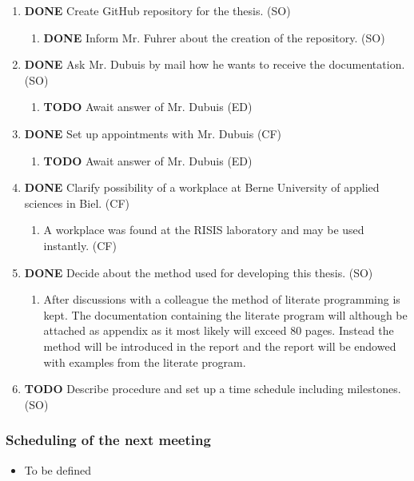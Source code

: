 \documentclass[10pt, openright, notitlepage]{scrreprt}
\begin{document}
\begin{enumerate}
\item {\bfseries\sffamily DONE} Create GitHub repository for the thesis. (SO)
\label{sec:org4871338}
\begin{enumerate}
\item {\bfseries\sffamily DONE} Inform Mr. Fuhrer about the creation of the repository. (SO)
\label{sec:orgc65ff25}
\end{enumerate}

\item {\bfseries\sffamily DONE} Ask Mr. Dubuis by mail how he wants to receive the documentation. (SO)
\label{sec:orgde68638}
\begin{enumerate}
\item {\bfseries\sffamily TODO} Await answer of Mr. Dubuis (ED)
\label{sec:org5fd9547}
\end{enumerate}

\item {\bfseries\sffamily DONE} Set up appointments with Mr. Dubuis (CF)
\label{sec:org91cb937}
\begin{enumerate}
\item {\bfseries\sffamily TODO} Await answer of Mr. Dubuis (ED)
\label{sec:orgdff7c72}
\end{enumerate}

\item {\bfseries\sffamily DONE} Clarify possibility of a workplace at Berne University of applied sciences in Biel. (CF)
\label{sec:orgf77def7}
\begin{enumerate}
\item A workplace was found at the RISIS laboratory and may be used instantly. (CF)
\label{sec:org6371910}
\end{enumerate}

\item {\bfseries\sffamily DONE} Decide about the method used for developing this thesis. (SO)
\label{sec:org8ebab94}
\begin{enumerate}
\item After discussions with a colleague the method of literate programming is
\label{sec:org0278082}
kept. The documentation containing the literate program will although be
attached as appendix as it most likely will exceed 80 pages. Instead the
method will be introduced in the report and the report will be endowed
with examples from the literate program.
\end{enumerate}

\item {\bfseries\sffamily TODO} Describe procedure and set up a time schedule including milestones. (SO)
\label{sec:orge80ccc1}
\end{enumerate}

\subsubsection{Scheduling of the next meeting}
\label{sec:orgac027c6}

\begin{itemize}
\item To be defined
\end{itemize}
\end{document}
